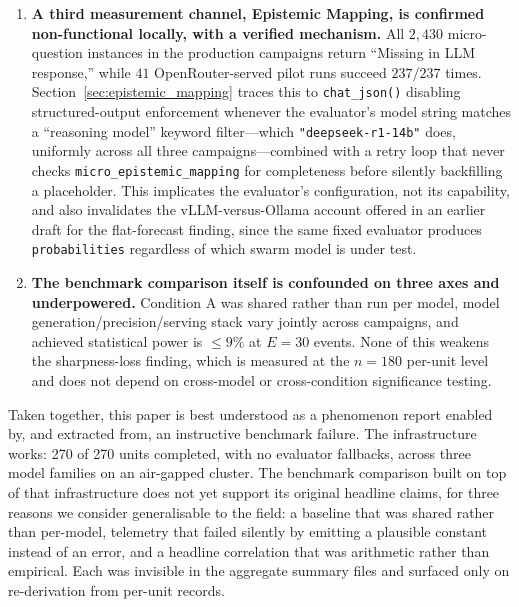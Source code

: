 \documentclass[11pt,journal,onecolumn]{IEEEtran}
\begin{document}
\begin{enumerate}
    \item \textbf{A third measurement channel, Epistemic Mapping, is confirmed non-functional locally, with a verified mechanism.} All $2{,}430$ micro-question instances in the production campaigns return ``Missing in LLM response,'' while $41$ OpenRouter-served pilot runs succeed $237/237$ times. Section~\ref{sec:epistemic_mapping} traces this to \texttt{chat\_json()} disabling structured-output enforcement whenever the evaluator's model string matches a ``reasoning model'' keyword filter---which \texttt{"deepseek-r1-14b"} does, uniformly across all three campaigns---combined with a retry loop that never checks \texttt{micro\_epistemic\_mapping} for completeness before silently backfilling a placeholder. This implicates the evaluator's configuration, not its capability, and also invalidates the vLLM-versus-Ollama account offered in an earlier draft for the flat-forecast finding, since the same fixed evaluator produces \texttt{probabilities} regardless of which swarm model is under test.
    \item \textbf{The benchmark comparison itself is confounded on three axes and underpowered.} Condition A was shared rather than run per model, model generation/precision/serving stack vary jointly across campaigns, and achieved statistical power is $\leq 9\%$ at $E=30$ events. None of this weakens the sharpness-loss finding, which is measured at the $n=180$ per-unit level and does not depend on cross-model or cross-condition significance testing.
\end{enumerate}

Taken together, this paper is best understood as a phenomenon report enabled by, and extracted from, an instructive benchmark failure. The infrastructure works: 270 of 270 units completed, with no evaluator fallbacks, across three model families on an air-gapped cluster. The benchmark comparison built on top of that infrastructure does not yet support its original headline claims, for three reasons we consider generalisable to the field: a baseline that was shared rather than per-model, telemetry that failed silently by emitting a plausible constant instead of an error, and a headline correlation that was arithmetic rather than empirical. Each was invisible in the aggregate summary files and surfaced only on re-derivation from per-unit records.
\end{document}
